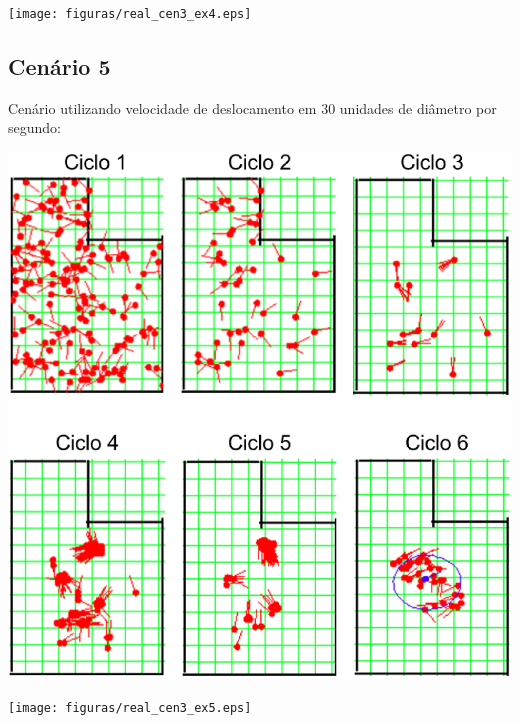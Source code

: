 {\centering
\texttt{[image: figuras/real\_cen3\_ex4.eps]}
\label{img:real_cen3_ex4}
\par}

\subsection{Cenário 5}

Cenário utilizando velocidade de deslocamento em 30 unidades de diâmetro por segundo:

{\centering
\includegraphics[scale=0.4]{figuras/cen3_ex5.eps}
\label{img:cen3_ex5}
\par}

{\centering
\texttt{[image: figuras/real\_cen3\_ex5.eps]}
\label{img:real_cen3_ex5}
\par}
